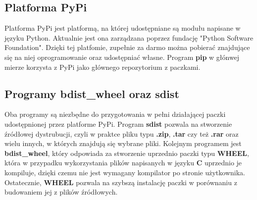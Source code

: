 \subsection{Platforma PyPi}
\quad Platforma PyPi jest platformą, na której udostępniane są modułu napisane w języku Python. Aktualnie jest ona zarządzana poprzez fundację "Python Software Foundation". Dzięki tej platfomie, zupełnie za darmo można pobierać znajdujące się na niej oprogramowanie oraz udostępniać własne. Program \textbf{pip} w głónwej mierze korzysta z PyPi jako głównego repozytorium z paczkami. 

\subsection{Programy bdist\_wheel oraz sdist}
\quad Oba programy są niezbędne do przygotowania w pełni działającej paczki udostępnionej przez platforme PyPi. Program \textbf{sdist} pozwala na stworzenie źródłowej dystrubucji, czyli w praktce pliku typu \textbf{.zip}, \textbf{.tar} czy też \textbf{.rar} oraz wielu innych, w których znajdują się wybrane pliki. 
\quad Kolejnym programem jest \textbf{bdist\_wheel}, który odpowiada za stworzenie uprzednio paczki typu \textbf{WHEEL}, która w przypadku wykorzystania plików napisanych w języku \textbf{C} uprzednio je kompiluje, dzięki czemu nie jest wymagany kompilator po stronie użytkownika. Ostatecznie, \textbf{WHEEL} pozwala na szybszą instalację paczki w porównaniu z budowaniem jej z plików źródłowych. 







